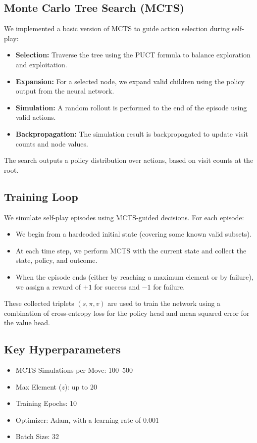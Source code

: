 \documentclass[12pt]{article}
\begin{document}
\subsection{Monte Carlo Tree Search (MCTS)}
We implemented a basic version of MCTS to guide action selection during self-play:
\begin{itemize}
    \item \textbf{Selection:} Traverse the tree using the PUCT formula to balance exploration and exploitation.
    \item \textbf{Expansion:} For a selected node, we expand valid children using the policy output from the neural network.
    \item \textbf{Simulation:} A random rollout is performed to the end of the episode using valid actions.
    \item \textbf{Backpropagation:} The simulation result is backpropagated to update visit counts and node values.
\end{itemize}
The search outputs a policy distribution over actions, based on visit counts at the root.

\subsection{Training Loop}
We simulate self-play episodes using MCTS-guided decisions. For each episode:
\begin{itemize}
    \item We begin from a hardcoded initial state (covering some known valid subsets).
    \item At each time step, we perform MCTS with the current state and collect the state, policy, and outcome.
    \item When the episode ends (either by reaching a maximum element or by failure), we assign a reward of $+1$ for success and $-1$ for failure.
\end{itemize}
These collected triplets $(s, \pi, v)$ are used to train the network using a combination of cross-entropy loss for the policy head and mean squared error for the value head.

\subsection{Key Hyperparameters}
\begin{itemize}
    \item MCTS Simulations per Move: 100--500
    \item Max Element ($z$): up to 20
    \item Training Epochs: 10
    \item Optimizer: Adam, with a learning rate of $0.001$
    \item Batch Size: 32
\end{itemize}
\end{document}

